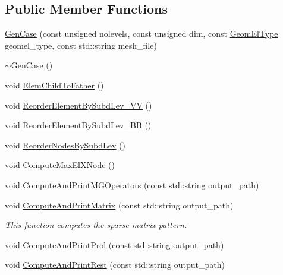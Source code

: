 \subsection*{Public Member Functions}
\begin{DoxyCompactItemize}
\item 
\mbox{\hyperlink{classfemus_1_1_gen_case_aac5da7e30562ce9e894192215c2db96c}{Gen\+Case}} (const unsigned nolevels, const unsigned dim, const \mbox{\hyperlink{_geom_el_type_enum_8hpp_a5f4d1ffd8f6d0e4930c05074e733031d}{Geom\+El\+Type}} geomel\+\_\+type, const std\+::string mesh\+\_\+file)
\item 
\mbox{\hyperlink{classfemus_1_1_gen_case_ae154b7b406541bda5fc562ac7350574f}{$\sim$\+Gen\+Case}} ()
\item 
void \mbox{\hyperlink{classfemus_1_1_gen_case_a1f32c3d80b3a5f9e60f6f2ef64d7957e}{Elem\+Child\+To\+Father}} ()
\item 
void \mbox{\hyperlink{classfemus_1_1_gen_case_ac8a4b195137869e5aea20553baa8b37d}{Reorder\+Element\+By\+Subd\+Lev\+\_\+\+VV}} ()
\item 
void \mbox{\hyperlink{classfemus_1_1_gen_case_a7dd80e2b843180f82f9c8a11b9114ec5}{Reorder\+Element\+By\+Subd\+Lev\+\_\+\+BB}} ()
\item 
void \mbox{\hyperlink{classfemus_1_1_gen_case_a2c8dce7f34c3d4331c677c224d601fe2}{Reorder\+Nodes\+By\+Subd\+Lev}} ()
\item 
void \mbox{\hyperlink{classfemus_1_1_gen_case_a3f84519134fe7bdfc5040450fe49400e}{Compute\+Max\+El\+X\+Node}} ()
\item 
void \mbox{\hyperlink{classfemus_1_1_gen_case_a7638dda7e28540362e134cd783ac2826}{Compute\+And\+Print\+M\+G\+Operators}} (const std\+::string output\+\_\+path)
\item 
void \mbox{\hyperlink{classfemus_1_1_gen_case_af03fdb695fdbdd9328ab53c28e57b796}{Compute\+And\+Print\+Matrix}} (const std\+::string output\+\_\+path)
\begin{DoxyCompactList}\small\item\em This function computes the sparse matrix pattern. \end{DoxyCompactList}\item 
void \mbox{\hyperlink{classfemus_1_1_gen_case_acf6276fa8c123a0911b1cde3975b01e1}{Compute\+And\+Print\+Prol}} (const std\+::string output\+\_\+path)
\item 
void \mbox{\hyperlink{classfemus_1_1_gen_case_a35cd2513d9f9a0ca6d8ce50e71f34e7c}{Compute\+And\+Print\+Rest}} (const std\+::string output\+\_\+path)
\item 

\end{DoxyCompactItemize}
